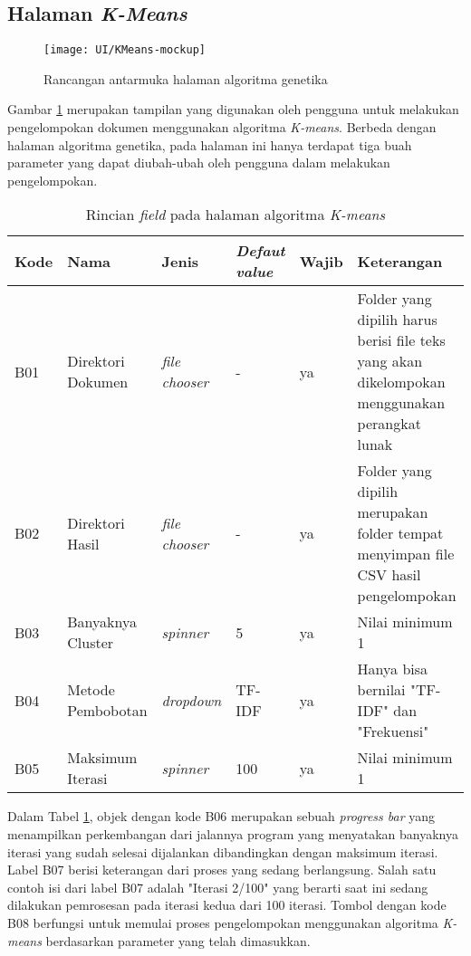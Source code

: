 \subsection{Halaman \textit{K-Means}}
\label{sub:ui-kmeans}
\begin{figure}[H]
	\begin{center}
		\texttt{[image: UI/KMeans-mockup]}
		\caption{Rancangan antarmuka halaman algoritma genetika}
		\label{fig:UI-KMeans}
	\end{center}
\end{figure}

Gambar \ref{fig:UI-KMeans} merupakan tampilan yang digunakan oleh pengguna untuk melakukan pengelompokan dokumen menggunakan algoritma \textit{K-means}. Berbeda dengan halaman algoritma genetika, pada halaman ini hanya terdapat tiga buah parameter yang dapat diubah-ubah oleh pengguna dalam melakukan pengelompokan.

\begin{table}[H]
	\renewcommand{\arraystretch}{2}
	\caption{Rincian \textit{field} pada halaman algoritma \textit{K-means}}
	\begin{tabularx}{\textwidth}{l X l X l X} \hline
		\textbf{Kode} & \textbf{Nama} & \textbf{Jenis} & \textbf{\textit{Defaut value}} & \textbf{Wajib} & \textbf{Keterangan} \\ \hline
		B01 & Direktori Dokumen & \textit{file chooser} & - & ya & Folder yang dipilih harus berisi file teks yang akan dikelompokan menggunakan perangkat lunak \\ \hline
		B02 & Direktori Hasil & \textit{file chooser} & - & ya & Folder yang dipilih merupakan folder tempat menyimpan file CSV hasil pengelompokan \\ \hline
		B03 & Banyaknya Cluster & \textit{spinner} & 5 & ya & Nilai minimum 1 \\ \hline
		B04 & Metode Pembobotan & \textit{dropdown} & TF-IDF & ya & Hanya bisa bernilai "TF-IDF" dan "Frekuensi" \\ \hline
		B05 & Maksimum Iterasi & \textit{spinner} & 100 & ya & Nilai minimum 1\\ \hline
	\end{tabularx}
	\label{tbl:field-KMeans}
\end{table}

Dalam Tabel \ref{tbl:field-KMeans}, objek dengan kode B06 merupakan sebuah \textit{progress bar} yang menampilkan perkembangan dari jalannya program yang menyatakan banyaknya iterasi yang sudah selesai dijalankan dibandingkan dengan maksimum iterasi. Label B07 berisi keterangan dari proses yang sedang berlangsung. Salah satu contoh isi dari label B07 adalah "Iterasi 2/100" yang berarti saat ini sedang dilakukan pemrosesan pada iterasi kedua dari 100 iterasi. Tombol dengan kode B08 berfungsi untuk memulai proses pengelompokan menggunakan algoritma \textit{K-means} berdasarkan parameter yang telah dimasukkan.
